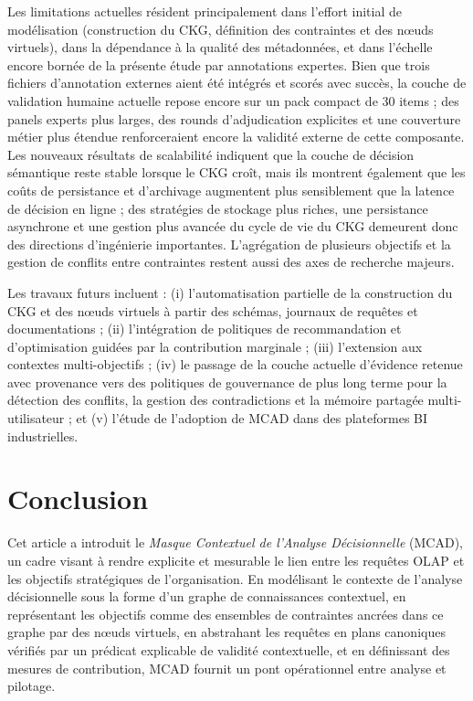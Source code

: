 \documentclass[journal]{IEEEtran}
\begin{document}
Les limitations actuelles résident principalement dans l'effort initial de modélisation (construction du CKG, définition des contraintes et des nœuds virtuels), dans la dépendance à la qualité des métadonnées, et dans l'échelle encore bornée de la présente étude par annotations expertes. Bien que trois fichiers d'annotation externes aient été intégrés et scorés avec succès, la couche de validation humaine actuelle repose encore sur un pack compact de 30 items ; des panels experts plus larges, des rounds d'adjudication explicites et une couverture métier plus étendue renforceraient encore la validité externe de cette composante. Les nouveaux résultats de scalabilité indiquent que la couche de décision sémantique reste stable lorsque le CKG croît, mais ils montrent également que les coûts de persistance et d'archivage augmentent plus sensiblement que la latence de décision en ligne ; des stratégies de stockage plus riches, une persistance asynchrone et une gestion plus avancée du cycle de vie du CKG demeurent donc des directions d'ingénierie importantes. L'agrégation de plusieurs objectifs et la gestion de conflits entre contraintes restent aussi des axes de recherche majeurs.

Les travaux futurs incluent : (i) l'automatisation partielle de la construction du CKG et des nœuds virtuels à partir des schémas, journaux de requêtes et documentations ; (ii) l'intégration de politiques de recommandation et d'optimisation guidées par la contribution marginale ; (iii) l'extension aux contextes multi-objectifs ; (iv) le passage de la couche actuelle d'évidence retenue avec provenance vers des politiques de gouvernance de plus long terme pour la détection des conflits, la gestion des contradictions et la mémoire partagée multi-utilisateur ; et (v) l'étude de l'adoption de MCAD dans des plateformes BI industrielles.

\section{Conclusion}
\label{sec:conclusion}

Cet article a introduit le \emph{Masque Contextuel de l'Analyse Décisionnelle} (MCAD), un cadre visant à rendre explicite et mesurable le lien entre les requêtes OLAP et les objectifs stratégiques de l'organisation. En modélisant le contexte de l'analyse décisionnelle sous la forme d'un graphe de connaissances contextuel, en représentant les objectifs comme des ensembles de contraintes ancrées dans ce graphe par des nœuds virtuels, en abstrahant les requêtes en plans canoniques vérifiés par un prédicat explicable de validité contextuelle, et en définissant des mesures de contribution, MCAD fournit un pont opérationnel entre analyse et pilotage.
\end{document}
